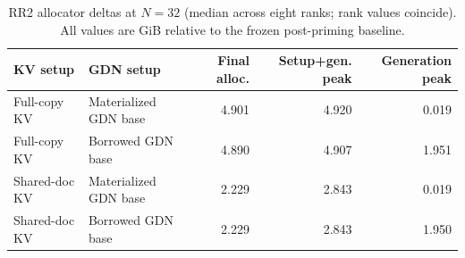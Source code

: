 \begin{table}[H]
\caption{RR2 allocator deltas at $N=32$ (median across eight ranks; rank values coincide). All values are GiB relative to the frozen post-priming baseline.}
\label{tab:rr2-memory}
\centering\scriptsize
\begin{tabular}{@{}llrrr@{}}
\toprule
KV setup & GDN setup & Final alloc. & Setup+gen. peak & Generation peak \\
\midrule
Full-copy KV & Materialized GDN base & 4.901 & 4.920 & 0.019 \\
Full-copy KV & Borrowed GDN base & 4.890 & 4.907 & 1.951 \\
Shared-doc KV & Materialized GDN base & 2.229 & 2.843 & 0.019 \\
Shared-doc KV & Borrowed GDN base & 2.229 & 2.843 & 1.950 \\
\bottomrule
\end{tabular}
\end{table}
